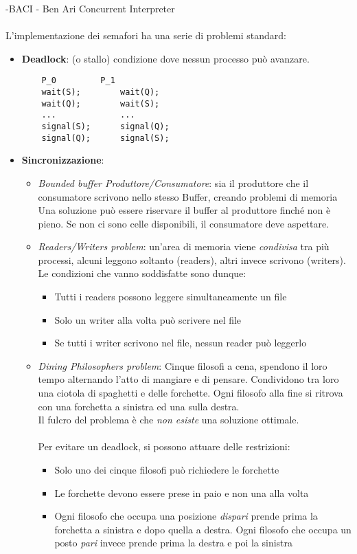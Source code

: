 \documentclass[12pt, a4paper]{article}
\begin{document}
	-BACI - Ben Ari Concurrent Interpreter \\ \\
	L'implementazione dei semafori ha una serie di problemi standard:
	\begin{itemize}
		\item \textbf{Deadlock}: (o stallo) condizione dove nessun processo può avanzare.
		\begin{lstlisting}
	P_0			P_1
	wait(S);		wait(Q);
	wait(Q);		wait(S);
	...				...
	signal(S);		signal(Q);
	signal(Q);		signal(S);
		\end{lstlisting}
		
		\item \textbf{Sincronizzazione}: 
			\begin{itemize}
				\item \textit{Bounded buffer Produttore/Consumatore}: sia il produttore che il consumatore scrivono nello stesso Buffer, creando problemi di memoria\\
				Una soluzione può essere riservare il buffer al produttore finché non è pieno. Se non ci sono celle disponibili, il consumatore deve aspettare.
				\item \textit{Readers/Writers problem}: un'area di memoria viene \textit{condivisa} tra più processi, alcuni leggono soltanto (readers), altri invece scrivono (writers). \\
				Le condizioni che vanno soddisfatte sono dunque:
				\begin{itemize}
					\item Tutti i readers possono leggere simultaneamente un file
					\item Solo un writer alla volta può scrivere nel file
					\item Se tutti i writer scrivono nel file, nessun reader può leggerlo
				\end{itemize}
				\item \textit{Dining Philosophers problem}: Cinque filosofi a cena, spendono il loro tempo alternando l'atto di mangiare e di pensare. Condividono tra loro una ciotola di spaghetti e delle forchette. Ogni filosofo alla fine si ritrova con una forchetta a sinistra ed una sulla destra. \\
				Il fulcro del problema è che \textit{non esiste} una soluzione ottimale. \\\\
				Per evitare un deadlock, si possono attuare delle restrizioni:
				\begin{itemize}
					\item Solo uno dei cinque filosofi può richiedere le forchette
					\item Le forchette devono essere prese in paio e non una alla volta
					\item Ogni filosofo che occupa una posizione \textit{dispari} prende prima la forchetta a sinistra e dopo quella a destra. Ogni filosofo che occupa un posto \textit{pari} invece prende prima la destra e poi la sinistra
				\end{itemize}
			\end{itemize}
	\end{itemize}
\end{document}
